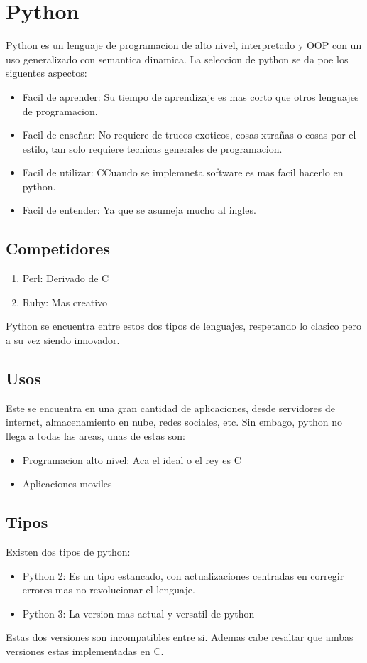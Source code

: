 \documentclass{article}
\begin{document}
\section{Python}
Python es un lenguaje de programacion de alto nivel, interpretado y OOP con un uso generalizado con semantica dinamica. La seleccion de python se da poe los siguentes aspectos:
\begin{itemize}
    \item Facil de aprender: Su tiempo de aprendizaje es mas corto que otros lenguajes de programacion.
    \item Facil de enseñar: No requiere de trucos exoticos, cosas xtrañas o cosas por el estilo, tan solo requiere tecnicas generales de programacion.
    \item Facil de utilizar: CCuando se implemneta software es mas facil hacerlo en python.
    \item Facil de entender: Ya que se asumeja mucho al ingles.
\end{itemize}
\subsection{Competidores}
\begin{enumerate}
    \item Perl: Derivado de C
    \item Ruby: Mas creativo
\end{enumerate}
Python se encuentra entre estos dos tipos de lenguajes, respetando lo clasico pero a su vez siendo innovador. 
\subsection{Usos}
Este se encuentra en una gran cantidad de aplicaciones, desde servidores de internet, almacenamiento en nube, redes sociales, etc. Sin embago, python no llega a todas las areas, unas de estas son:
\begin{itemize}
    \item Programacion alto nivel:  Aca el ideal o el rey es C
    \item Aplicaciones moviles
\end{itemize}
\subsection{Tipos}
Existen dos tipos de python: 
\begin{itemize}
    \item Python 2: Es un tipo estancado, con actualizaciones centradas en corregir errores mas no revolucionar el lenguaje.
    \item Python 3: La version mas actual y versatil de python
\end{itemize}
Estas dos versiones son incompatibles entre si. Ademas cabe resaltar que ambas versiones estas implementadas en C.
\end{document}
